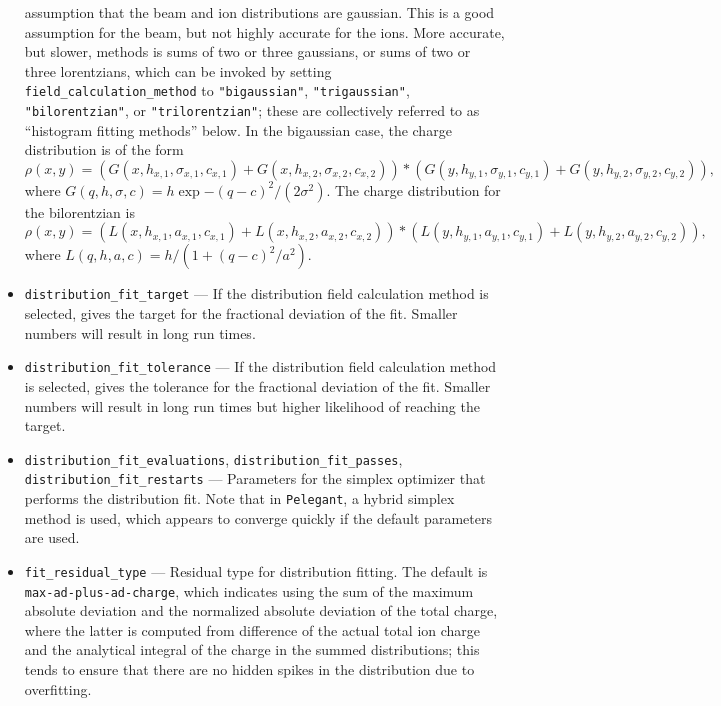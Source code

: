 \documentclass[11pt]{article}
\begin{document}
\begin{itemize}
  assumption that the beam and ion distributions are gaussian. This is a good assumption for the beam, but not highly accurate
  for the ions. More accurate, but slower, methods is sums of two or three gaussians, or sums 
  of two or three lorentzians, which can be invoked by setting
  \verb|field_calculation_method| to \verb|"bigaussian"|, \verb|"trigaussian"|, \verb|"bilorentzian"|, or \verb|"trilorentzian"|;
  these are collectively referred to as ``histogram fitting methods'' below.
  In the bigaussian case, the charge distribution is of the form
  \begin{equation}
    \rho(x, y) = (G(x, h_{x,1}, \sigma_{x,1}, c_{x,1}) + G(x, h_{x,2}, \sigma_{x,2}, c_{x,2}))*
    (G(y, h_{y,1}, \sigma_{y,1}, c_{y,1}) + G(y, h_{y,2}, \sigma_{y,2}, c_{y,2})),
  \end{equation}
  where $G(q, h, \sigma, c) = h\exp{-(q-c)^2/(2\sigma^2)}$.
  The charge distribution for the bilorentzian is
  \begin{equation}
    \rho(x, y) = (L(x, h_{x,1}, a_{x,1}, c_{x,1}) + L(x, h_{x,2}, a_{x,2}, c_{x,2}))*
    (L(y, h_{y,1}, a_{y,1}, c_{y,1}) + L(y, h_{y,2}, a_{y,2}, c_{y,2})),
  \end{equation}
  where $L(q, h, a, c) = h/(1 + (q-c)^2/a^2)$.
\item \verb|distribution_fit_target| --- If the distribution field calculation method is selected, gives the target for the
  fractional deviation of the fit. Smaller numbers will result in long run times.
\item \verb|distribution_fit_tolerance| --- If the distribution field calculation method is selected, gives the tolerance for the
  fractional deviation of the fit. Smaller numbers will result in long run times but higher likelihood of reaching the target.
\item \verb|distribution_fit_evaluations|, \verb|distribution_fit_passes|, \verb|distribution_fit_restarts| --- Parameters
  for the simplex optimizer that performs the distribution fit. Note that in \verb|Pelegant|, a hybrid simplex method is
  used, which appears to converge quickly if the default parameters are used.
\item \verb|fit_residual_type| --- Residual type for distribution fitting. The default is \verb|max-ad-plus-ad-charge|, which
  indicates using the sum of the maximum absolute deviation and the normalized absolute deviation of the total charge, where
  the latter is computed from difference of the actual total ion charge and the analytical integral of the charge 
  in the summed distributions; this tends to ensure that there are no hidden spikes in the distribution due to overfitting.

\end{itemize}
\end{document}
